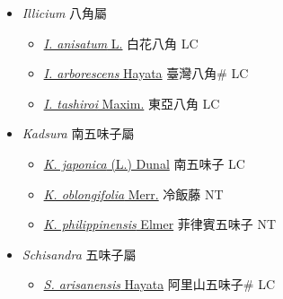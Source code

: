 
  \begin{itemize}
 \item[] \textit{Illicium} 八角屬
                    
  \begin{itemize}
        \item[] \href{http://www.theplantlist.org/tpl1.1/search?q=Illicium+anisatum}{\textit{I. anisatum} L.}   白花八角 LC
        \item[] \href{http://www.theplantlist.org/tpl1.1/search?q=Illicium+arborescens}{\textit{I. arborescens} Hayata}   臺灣八角\# LC
        \item[] \href{http://www.theplantlist.org/tpl1.1/search?q=Illicium+tashiroi}{\textit{I. tashiroi} Maxim.}   東亞八角 LC
  \end{itemize}
 \item[] \textit{Kadsura} 南五味子屬
                    
  \begin{itemize}
        \item[] \href{http://www.theplantlist.org/tpl1.1/search?q=Kadsura+japonica}{\textit{K. japonica} (L.) Dunal}   南五味子 LC
        \item[] \href{http://www.theplantlist.org/tpl1.1/search?q=Kadsura+oblongifolia}{\textit{K. oblongifolia} Merr.}   冷飯藤 NT
        \item[] \href{http://www.theplantlist.org/tpl1.1/search?q=Kadsura+philippinensis}{\textit{K. philippinensis} Elmer}   菲律賓五味子 NT
  \end{itemize}
 \item[] \textit{Schisandra} 五味子屬
                    
  \begin{itemize}
        \item[] \href{http://www.theplantlist.org/tpl1.1/search?q=Schisandra+arisanensis}{\textit{S. arisanensis} Hayata}   阿里山五味子\# LC
  \end{itemize}
  \end{itemize}
